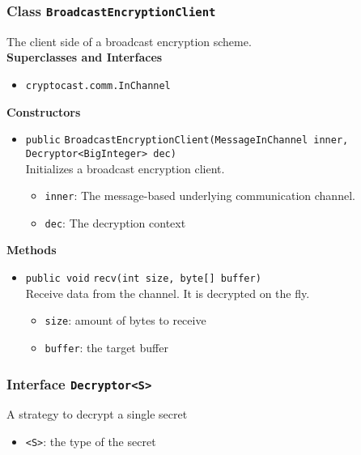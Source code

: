 \subsubsection{Class \lstinline|BroadcastEncryptionClient|}
The client side of a broadcast encryption scheme. \\


\textbf{Superclasses and Interfaces}
\begin{itemize}
\item \lstinline|cryptocast.comm.InChannel|
\end{itemize}



\textbf{Constructors}
\begin{itemize}
\item \lstinline|public| \lstinline|BroadcastEncryptionClient|\lstinline|(MessageInChannel inner, Decryptor<BigInteger> dec)|\\
Initializes a broadcast encryption client.
\begin{itemize}
\item \lstinline|inner|: The message-based underlying communication channel.
\item \lstinline|dec|: The decryption context
\end{itemize}



\end{itemize}


\textbf{Methods}
\begin{itemize}
\item \lstinline|public void| \lstinline|recv|\lstinline|(int size, byte[] buffer)|\\
Receive data from the channel. It is decrypted on the fly.
\begin{itemize}
\item \lstinline|size|: amount of bytes to receive
\item \lstinline|buffer|: the target buffer
\end{itemize}



\end{itemize}

\subsubsection{Interface \lstinline|Decryptor<S>|}
A strategy to decrypt a single secret \\


\begin{itemize}
\item \lstinline|<S>|: the type of the secret
\end{itemize}



